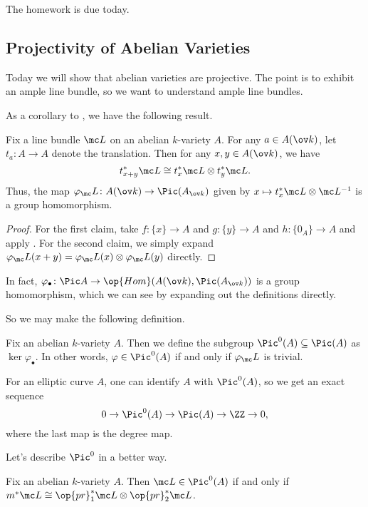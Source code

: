 \documentclass[../notes.tex]{subfiles}
\begin{document}
The homework is due today.

\subsection{Projectivity of Abelian Varieties}
Today we will show that abelian varieties are projective. The point is to exhibit an ample line bundle, so we want to understand ample line bundles.

As a corollary to , we have the following result.
\begin{theorem}
	Fix a line bundle $\mc L$ on an abelian $k$-variety $A$. For any $a\in A(\ov k)$, let $t_a\colon A\to A$ denote the translation. Then for any $x,y\in A(\ov k)$, we have
	\[t_{x+y}^*\mc L\cong t_x^*\mc L\otimes t_y^*\mc L.\]
	Thus, the map $\varphi_\mc L\colon A(\ov k)\to\Pic(A_{\ov k})$ given by $x\mapsto t_x^*\mc L\otimes\mc L^{-1}$ is a group homomorphism.
\end{theorem}
\begin{proof}
	For the first claim, take $f\colon\{x\}\to A$ and $g\colon\{y\}\to A$ and $h\colon\{0_A\}\to A$ and apply . For the second claim, we simply expand $\varphi_\mc L(x+y)=\varphi_\mc L(x)\otimes\varphi_\mc L(y)$ directly.
\end{proof}
\begin{remark}
	In fact, $\varphi_\bullet\colon\Pic A\to\op{Hom}(A(\ov k),\Pic(A_{\ov k}))$ is a group homomorphism, which we can see by expanding out the definitions directly.
\end{remark}
So we may make the following definition.
\begin{definition}
	Fix an abelian $k$-variety $A$. Then we define the subgroup $\Pic^0(A)\subseteq\Pic(A)$ as $\ker\varphi_\bullet$. In other words, $\varphi\in\Pic^0(A)$ if and only if $\varphi_\mc L$ is trivial.
\end{definition}
\begin{example}
	For an elliptic curve $A$, one can identify $A$ with $\Pic^0(A)$, so we get an exact sequence
	\[0\to\Pic^0(A)\to\Pic(A)\to\ZZ\to0,\]
	where the last map is the degree map.%
\end{example}
Let's describe $\Pic^0$ in a better way.
\begin{lemma} \label{lem:better-pic0}
	Fix an abelian $k$-variety $A$. Then $\mc L\in\Pic^0(A)$ if and only if $m^*\mc L\cong\op{pr}_1^*\mc L\otimes\op{pr}_2^*\mc L$.
\end{lemma}
\end{document}

